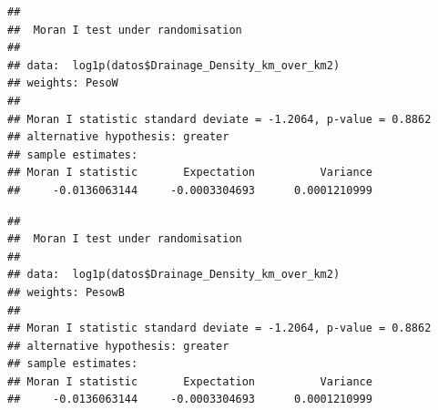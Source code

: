\documentclass[11pt,]{article}
\newenvironment{Shaded}{\begin{snugshade}}{\end{snugshade}}
\newcommand{\KeywordTok}[1]{\textcolor[rgb]{0.13,0.29,0.53}{\textbf{#1}}}
\newcommand{\DataTypeTok}[1]{\textcolor[rgb]{0.13,0.29,0.53}{#1}}
\newcommand{\StringTok}[1]{\textcolor[rgb]{0.31,0.60,0.02}{#1}}
\newcommand{\OperatorTok}[1]{\textcolor[rgb]{0.81,0.36,0.00}{\textbf{#1}}}
\newcommand{\NormalTok}[1]{#1}
\begin{document}
\begin{Shaded}
\end{Shaded}

\begin{verbatim}
## 
##  Moran I test under randomisation
## 
## data:  log1p(datos$Drainage_Density_km_over_km2)  
## weights: PesoW    
## 
## Moran I statistic standard deviate = -1.2064, p-value = 0.8862
## alternative hypothesis: greater
## sample estimates:
## Moran I statistic       Expectation          Variance 
##     -0.0136063144     -0.0003304693      0.0001210999
\end{verbatim}

\begin{Shaded}
\end{Shaded}

\begin{verbatim}
## 
##  Moran I test under randomisation
## 
## data:  log1p(datos$Drainage_Density_km_over_km2)  
## weights: PesowB    
## 
## Moran I statistic standard deviate = -1.2064, p-value = 0.8862
## alternative hypothesis: greater
## sample estimates:
## Moran I statistic       Expectation          Variance 
##     -0.0136063144     -0.0003304693      0.0001210999
\end{verbatim}

\begin{Shaded}
\end{Shaded}
\end{document}
